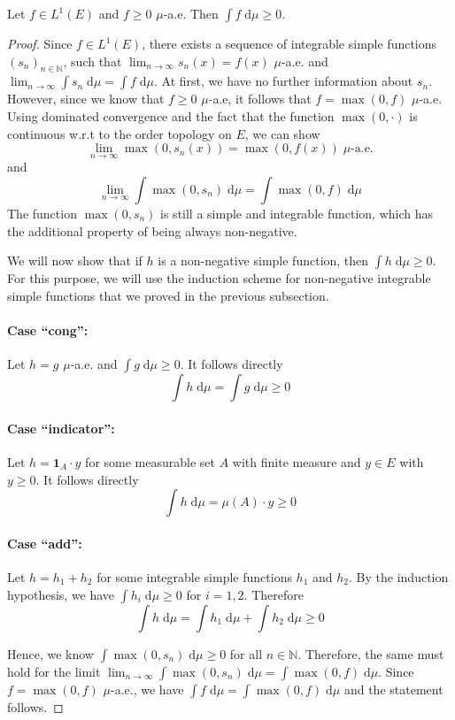 \begin{lemma}
	Let $f \in L^1(E)$ and $f \ge 0$ $\mu$-a.e. Then $\int f \;\textrm{d}\mu \ge 0$.
\end{lemma}
\begin{proof}
	Since $f \in L^1(E)$, there exists a sequence of integrable simple functions $(s_n)_{n \in \mathbb{N}}$, such that $\lim_{n \to \infty} s_n(x) = f(x)$ $\mu$-a.e. and $\lim_{n \to \infty} \int s_n \;\textrm{d}\mu = \int f \;\textrm{d}\mu$. At first, we have no further information about $s_n$. However, since we know that $f \ge 0$ $\mu$-a.e, it follows that $f = \max(0,f)$ $\mu$-a.e. Using dominated convergence and the fact that the function $\max(0,\cdot)$ is continuous w.r.t to the order topology on $E$, we can show
\[
	\lim_{n \to \infty} \max(0, s_n(x)) = \max(0, f(x)) \; \mu\textrm{-a.e.}
\]
and
\[
	\lim_{n \to \infty} \int \max(0, s_n) \;\textrm{d}\mu = \int \max(0, f) \;\textrm{d}\mu
\]
The function $\max(0, s_n)$ is still a simple and integrable function, which has the additional property of being always non-negative. 

We will now show that if $h$ is a non-negative simple function, then $\int h \;\textrm{d}\mu \ge 0$. For this purpose, we will use the induction scheme for non-negative integrable simple functions that we proved in the previous subsection.

\paragraph{Case ``cong'':} Let $h = g$ $\mu$-a.e. and $\int g \;\textrm{d}\mu \ge 0$. It follows directly
\[
	\int h \;\textrm{d}\mu = \int g \;\textrm{d}\mu \ge 0
\]

\paragraph{Case ``indicator'':} Let $h = \mathbf{1}_A \cdot y$ for some measurable set $A$ with finite measure and $y \in E$ with $y \ge 0$. It follows directly 
\[
	\int h \;\textrm{d}\mu = \mu(A) \cdot y \ge 0
\]

\paragraph{Case ``add'':} Let $h = h_1 + h_2$ for some integrable simple functions $h_1$ and $h_2$. By the induction hypothesis, we have $\int h_i \;\textrm{d}\mu \ge 0$ for $i = 1,2$. Therefore
\[
	\int h \;\textrm{d}\mu = \int h_1 \;\textrm{d}\mu + \int h_2 \;\textrm{d}\mu \ge 0
\]

Hence, we know $\int \max(0, s_n) \;\textrm{d}\mu \ge 0$ for all $n \in \mathbb{N}$. Therefore, the same must hold for the limit $\lim_{n \to \infty} \int \max(0, s_n) \;\textrm{d}\mu = \int \max(0, f) \;\textrm{d}\mu$. Since $f = \max(0,f)$ $\mu$-a.e., we have $\int f \;\textrm{d}\mu = \int \max(0, f) \;\textrm{d}\mu$ and the statement follows.

\end{proof}

